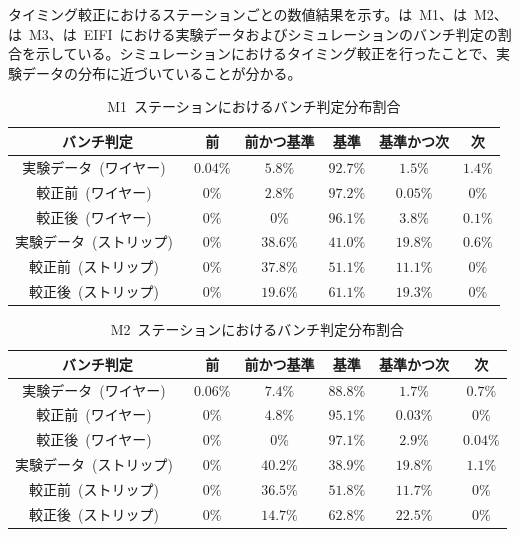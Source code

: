 タイミング較正におけるステーションごとの数値結果を示す。は~M1、は~M2、は~M3、は~EIFI~における実験データおよびシミュレーションのバンチ判定の割合を示している。シミュレーションにおけるタイミング較正を行ったことで、実験データの分布に近づいていることが分かる。
\begin{table}[htb]
	\centering
	\begin{tabular}{c|c|c|c|c|c}\hline
	バンチ判定&前&前かつ基準&基準&基準かつ次&次 \\ \hline\hline
	実験データ~(ワイヤー)~& $0.04\%$ & $5.8\%$ & $92.7\%$ & $1.5\%$ & $1.4\%$ \\
	較正前~(ワイヤー)~& $0\%$ & $2.8\%$ & $97.2\%$ & $0.05\%$ & $0\%$ \\ 
	較正後~(ワイヤー)~& $0\%$ & $0\%$ & $96.1\%$ & $3.8\%$ & $0.1\%$ \\ \hline
	実験データ~(ストリップ)~& $0\%$ & $38.6\%$ & $41.0\%$ & $19.8\%$ & $0.6\%$ \\
	較正前~(ストリップ)~& $0\%$ & $37.8\%$ & $51.1\%$ & $11.1\%$ & $0\%$ \\
	較正後~(ストリップ)~& $0\%$ & $19.6\%$ & $61.1\%$ & $19.3\%$ & $0\%$ \\ \hline
	\end{tabular}
	\caption{M1~ステーションにおけるバンチ判定分布割合}\label{tb:tunebcidM1}
\end{table}

\begin{table}[htb]
	\centering
	\begin{tabular}{c|c|c|c|c|c}\hline
	バンチ判定&前&前かつ基準&基準&基準かつ次&次 \\ \hline\hline
	実験データ~(ワイヤー)~& $0.06\%$ & $7.4\%$ & $88.8\%$ & $1.7\%$ & $0.7\%$ \\
	較正前~(ワイヤー)~& $0\%$ & $4.8\%$ & $95.1\%$ & $0.03\%$ & $0\%$ \\ 
	較正後~(ワイヤー)~& $0\%$ & $0\%$ & $97.1\%$ & $2.9\%$ & $0.04\%$ \\ \hline
	実験データ~(ストリップ)~& $0\%$ & $40.2\%$ & $38.9\%$ & $19.8\%$ & $1.1\%$ \\
	較正前~(ストリップ)~& $0\%$ & $36.5\%$ & $51.8\%$ & $11.7\%$ & $0\%$ \\
	較正後~(ストリップ)~& $0\%$ & $14.7\%$ & $62.8\%$ & $22.5\%$ & $0\%$ \\ \hline
	\end{tabular}
	\caption{M2~ステーションにおけるバンチ判定分布割合}\label{tb:tunebcidM2}
\end{table}

